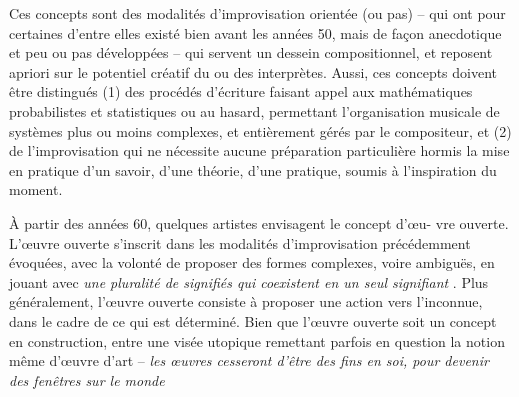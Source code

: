 Ces concepts sont des modalités d'improvisation orientée (ou pas) -- qui ont pour certaines d'entre elles existé bien avant les années 50, mais de façon anecdotique et peu ou pas développées -- qui servent un dessein compositionnel, et reposent apriori sur le potentiel créatif du ou des interprètes.  Aussi, ces concepts doivent être distingués (1) des procédés d'écriture faisant appel aux mathématiques probabilistes et statistiques ou au hasard, permettant l'organisation musicale de systèmes plus ou moins complexes, et entièrement gérés par le compositeur, et (2) de l'improvisation qui ne nécessite aucune préparation particulière hormis la mise en pratique d'un savoir, d'une théorie, d'une pratique, soumis à l'inspiration du moment. 

\bigskip

À partir des années 60, quelques artistes envisagent le concept d'œu- vre ouverte. L'œuvre ouverte s'inscrit dans les modalités d'improvisation précédemment évoquées, avec la volonté de proposer des formes complexes, voire ambiguës, en jouant avec \textit{une pluralité de signifiés qui coexistent en un seul signifiant}%
. Plus généralement, l'œuvre ouverte consiste à proposer une action vers l'inconnue, dans le cadre de ce qui est déterminé. 
Bien que l'œuvre ouverte soit un concept en construction, entre une visée utopique remettant parfois en question la notion même d'œuvre d'art -- \textit{les œuvres cesseront d'être des fins en soi, pour devenir des fenêtres sur le monde} %
